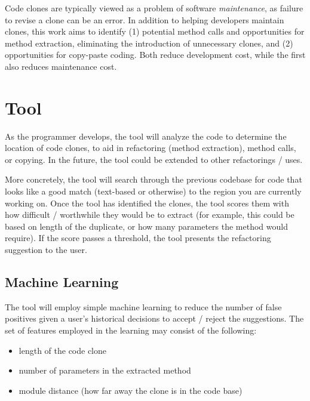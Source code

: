 \documentclass[preprint,10pt]{sigplanconf}
\begin{document}
Code clones are typically viewed as a problem of software
\emph{maintenance}, as failure to revise a clone can be an error. In
addition to helping developers maintain clones, this work aims to
identify (1) potential method calls and opportunities for method
extraction, eliminating the introduction of unnecessary clones, and
(2) opportunities for copy-paste coding. Both reduce development cost,
while the first also reduces maintenance cost.

\section{Tool}


As the programmer develops, the tool will analyze the code to
determine the location of code clones, to aid in refactoring (method
extraction), method calls, or copying. In the future, the tool could
be extended to other refactorings / uses.

More concretely, the tool will search through the previous codebase
for code that looks like a good match (text-based or otherwise) to the
region you are currently working on.  Once the tool has identified the
clones, the tool scores them with how difficult / worthwhile they
would be to extract (for example, this could be based on length of the
duplicate, or how many parameters the method would require).  If the
score passes a threshold, the tool presents the refactoring suggestion
to the user.  


\subsection{Machine Learning}
The tool will employ simple machine learning to reduce the number of
false positives given a user's historical decisions to accept / reject
the suggestions. The set of features employed in the learning may
consist of the following:

\begin{itemize}
  \item length of the code clone
  \item number of parameters in the extracted method
  \item module distance (how far away the clone is in the code base)
\end{itemize}
\end{document}
